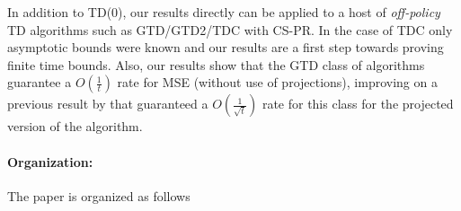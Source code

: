 In addition to TD($0$), our results directly can be applied to a host of \emph{off-policy} TD algorithms such as GTD/GTD2/TDC with CS-PR. 
In the case of TDC only asymptotic bounds were known \cite{gtd2} and our results are a first step 
 towards proving finite time bounds. Also, our results show that the GTD class of algorithms guarantee a $O(\frac{1}{t})$ rate for MSE (without use of projections), improving on a previous result by \citet{gtdmp} that guaranteed a $O(\frac{1}{\sqrt{t}})$ rate for this class for the projected version of the algorithm. 
\paragraph{Organization:} The paper is organized as follows 
